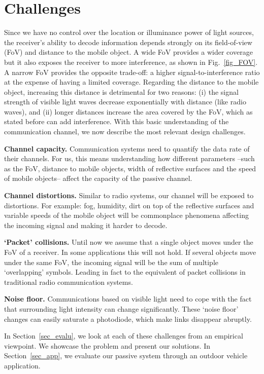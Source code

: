 \documentclass[10pt]{sig-alternate-05-2015}
\begin{document}
\section{Challenges}\label{sec:challenges}

Since we have no control over the location or illuminance power of light sources,  the receiver's ability to decode information depends strongly on its field-of-view (FoV) and distance to the mobile object. A wide FoV provides a wider coverage but it also exposes the receiver to more interference, as shown in Fig.~\ref{fig_FOV}. A narrow FoV provides the opposite trade-off: a higher signal-to-interference ratio at the expense of having a limited coverage. Regarding the distance to the mobile object, increasing this distance is detrimental for two reasons: (i) the signal strength of visible light waves decrease exponentially with distance (like radio waves), and (ii) longer distances increase the area covered by the FoV, which as stated before can add interference. With this basic understanding of the communication channel, we now describe the most relevant design challenges.

\textbf{Channel capacity.} Communication systems need to quantify the data rate of their channels. For us, this means understanding how different parameters --such as the FoV, distance to mobile objects, width of reflective surfaces and the speed of mobile objects-- affect the capacity of the passive channel.

\textbf{Channel distortions.} Similar to radio systems, our channel will be exposed to distortions. For example: fog, humidity, dirt on top of the reflective surfaces and variable speeds of the mobile object will be commonplace phenomena affecting the incoming signal and making it harder to decode. 

{\textbf{`Packet' collisions.} Until now we assume that a single object moves under the FoV of a receiver. In some applications this will not hold. If several objects move under the same FoV, the incoming signal will be the sum of multiple `overlapping' symbols. Leading in fact to the equivalent of packet collisions in traditional radio communication systems.}

\textbf{Noise floor.} Communications based on visible light need to cope with the fact that surrounding light intensity can change significantly. These `noise floor' changes can easily saturate a photodiode, which make links disappear abruptly.

In Section~\ref{sec_evalu}, we look at each of these challenges from an empirical viewpoint. We showcase the problem and present our solutions. In Section~\ref{sec_app}, we evaluate our passive system through an outdoor vehicle application. 
\end{document}
